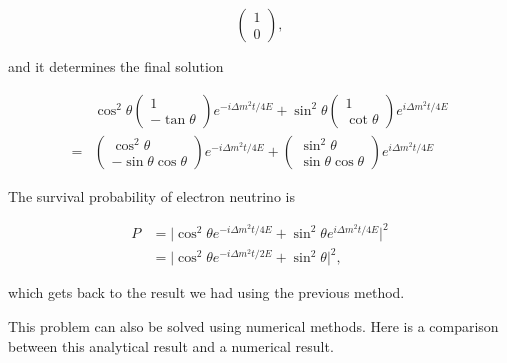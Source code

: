 \documentclass{tufte-handout}
\begin{document}
\begin{equation*}
\begin{pmatrix}
1 \\ 0
\end{pmatrix},
\end{equation*}

and it determines the final solution

\begin{align*}
& \cos^2\theta \begin{pmatrix}
1 \\ -\tan\theta
\end{pmatrix} e^{-i \Delta m^2 t/ 4E } + \sin^2\theta
\begin{pmatrix}
1 \\ \cot \theta
\end{pmatrix} e^{i  \Delta m^2 t/ 4E } \\
= & \begin{pmatrix}
\cos^2\theta \\ -\sin\theta \cos\theta
\end{pmatrix} e^{-i \Delta m^2 t/ 4E } +
\begin{pmatrix}
 \sin^2\theta \\ \sin\theta \cos \theta
\end{pmatrix} e^{i  \Delta m^2 t/ 4E } 
\end{align*}


The survival probability of electron neutrino is

\begin{align*}
P &= \lvert \cos^2\theta e^{-i \Delta m^2 t/4E} + \sin^2\theta e^{i\Delta m^2 t/4E} \rvert^2 \\
& = \lvert \cos^2 \theta e^{-i \Delta m^2 t/2E} + \sin^2 \theta \rvert ^2 ,
\end{align*}

which gets back to the result we had using the previous method.



This problem can also be solved using numerical methods. Here is a comparison between this analytical result and a numerical result.
\end{document}
